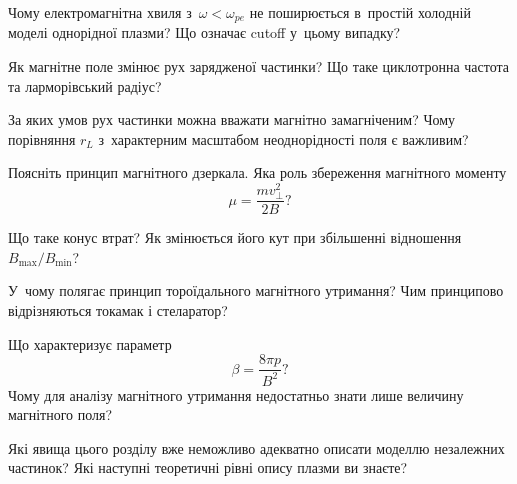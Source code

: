 \begin{Questions}
\begin{quizlist}
		\item Чому електромагнітна хвиля з~$\omega<\omega_{pe}$ не поширюється в~простій холодній моделі однорідної плазми? Що означає cutoff у~цьому випадку?

		\item Як магнітне поле змінює рух зарядженої частинки? Що таке циклотронна частота та ларморівський радіус?

		\item За яких умов рух частинки можна вважати магнітно замагніченим? Чому порівняння $r_L$ з~характерним масштабом неоднорідності поля є важливим?

		\item Поясніть принцип магнітного дзеркала. Яка роль збереження магнітного моменту
		\begin{equation*}
			\mu=\frac{m v_\perp^2}{2B}?
		\end{equation*}

		\item Що таке конус втрат? Як змінюється його кут при збільшенні відношення $B_{\max}/B_{\min}$?

		\item У~чому полягає принцип тороїдального магнітного утримання? Чим принципово відрізняються токамак і стеларатор?

		\item Що характеризує параметр
		\begin{equation*}
			\beta=\frac{8\pi p}{B^2}?
		\end{equation*}
		Чому для аналізу магнітного утримання недостатньо знати лише величину магнітного поля?

		\item Які явища цього розділу вже неможливо адекватно описати моделлю незалежних частинок? Які наступні теоретичні рівні опису плазми ви знаєте?
	\end{quizlist}
\end{Questions}
